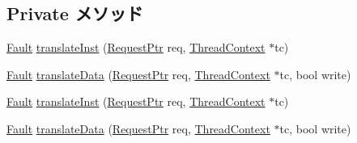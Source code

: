 \subsection*{Private メソッド}
\begin{DoxyCompactItemize}
\item 
\hyperlink{classRefCountingPtr}{Fault} \hyperlink{classMipsISA_1_1TLB_a072afd8ed455dade4c25a85510e5a4da}{translateInst} (\hyperlink{classRequest}{RequestPtr} req, \hyperlink{classThreadContext}{ThreadContext} $\ast$tc)
\item 
\hyperlink{classRefCountingPtr}{Fault} \hyperlink{classMipsISA_1_1TLB_ad54aef66412f77e2a15a621a126dfb52}{translateData} (\hyperlink{classRequest}{RequestPtr} req, \hyperlink{classThreadContext}{ThreadContext} $\ast$tc, bool write)
\item 
\hyperlink{classRefCountingPtr}{Fault} \hyperlink{classMipsISA_1_1TLB_a072afd8ed455dade4c25a85510e5a4da}{translateInst} (\hyperlink{classRequest}{RequestPtr} req, \hyperlink{classThreadContext}{ThreadContext} $\ast$tc)
\item 
\hyperlink{classRefCountingPtr}{Fault} \hyperlink{classMipsISA_1_1TLB_ad54aef66412f77e2a15a621a126dfb52}{translateData} (\hyperlink{classRequest}{RequestPtr} req, \hyperlink{classThreadContext}{ThreadContext} $\ast$tc, bool write)
\end{DoxyCompactItemize}


